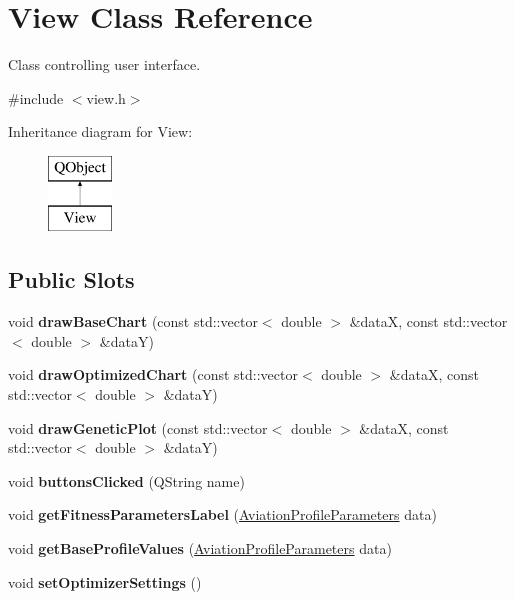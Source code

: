 \hypertarget{class_view}{}\section{View Class Reference}
\label{class_view}


Class controlling user interface.  




{\ttfamily \#include $<$view.\+h$>$}

Inheritance diagram for View\+:\begin{figure}[H]
\begin{center}
\leavevmode
\includegraphics[height=2.000000cm]{class_view}
\end{center}
\end{figure}
\subsection*{Public Slots}
\begin{DoxyCompactItemize}
\item 
\mbox{\label{class_view_ae947cd6d87306563e8827d80448c1f28}} 
void {\bfseries draw\+Base\+Chart} (const std\+::vector$<$ double $>$ \&dataX, const std\+::vector$<$ double $>$ \&dataY)
\item 
\mbox{\label{class_view_ad0df9f601ff799e4555e4662e1b0352c}} 
void {\bfseries draw\+Optimized\+Chart} (const std\+::vector$<$ double $>$ \&dataX, const std\+::vector$<$ double $>$ \&dataY)
\item 
\mbox{\label{class_view_a81a7e65b2a53ad30ce94b42c214dc3ef}} 
void {\bfseries draw\+Genetic\+Plot} (const std\+::vector$<$ double $>$ \&dataX, const std\+::vector$<$ double $>$ \&dataY)
\item 
\mbox{\label{class_view_a717cea2de9e99ba58fe35a574bb56554}} 
void {\bfseries buttons\+Clicked} (Q\+String name)
\item 
\mbox{\label{class_view_a2291d8c957e0095b57d76bb247d6a915}} 
void {\bfseries get\+Fitness\+Parameters\+Label} (\hyperlink{struct_aviation_profile_parameters}{Aviation\+Profile\+Parameters} data)
\item 
\mbox{\label{class_view_a47d43d8644c74f17993a4ce2754e5be7}} 
void {\bfseries get\+Base\+Profile\+Values} (\hyperlink{struct_aviation_profile_parameters}{Aviation\+Profile\+Parameters} data)
\item 
\mbox{\label{class_view_a2556a1b48f4c638f752b5e22e6044adb}} 
void {\bfseries set\+Optimizer\+Settings} ()
\end{DoxyCompactItemize}
